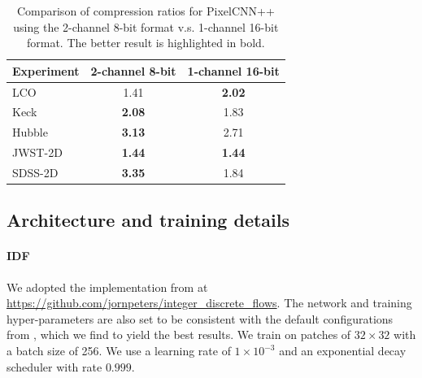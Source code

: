 \begin{table}[ht]
\centering
\begin{tabular}{lcc}
\hline
\textbf{Experiment} & \textbf{2-channel 8-bit} & \textbf{1-channel 16-bit} \\ \hline
LCO                & 1.41                     & \textbf{2.02}             \\ 
Keck               & \textbf{2.08}            & 1.83                      \\ 
Hubble             & \textbf{3.13}            & 2.71                      \\ 
JWST-2D            & \textbf{1.44}                     & \textbf{1.44}             \\ 
SDSS-2D            & \textbf{3.35}            & 1.84                      \\ \hline
\end{tabular}
\caption{Comparison of compression ratios for PixelCNN++ using the 2-channel 8-bit format v.s. 1-channel 16-bit format. The better result is highlighted in bold.}
\label{tab:8bit-vs-16bit}
\end{table}



\subsection{Architecture and training details}

\paragraph{IDF} 
We adopted the implementation from \citet{hoogeboom2019integer} at \url{https://github.com/jornpeters/integer_discrete_flows}.
The network and training hyper-parameters are also set to be consistent with the default configurations from \citep{hoogeboom2019integer}, which we find to yield the best results. We train on patches of $32\times32$ with a batch size of 256. We use a learning rate of $1 \times 10^{-3}$ and an exponential decay scheduler with rate $0.999$.

